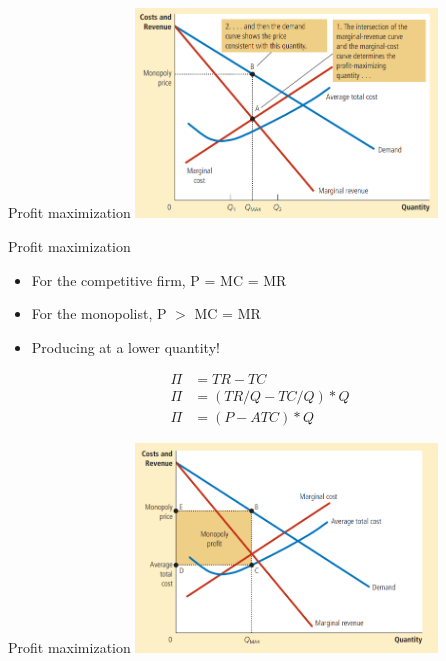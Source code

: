 \documentclass[aspectratio=169]{beamer}
\begin{document}
\begin{frame}{Profit maximization}
    \centering
    \includegraphics[width = 0.6\textwidth,keepaspectratio]{../figs/profitmax.png}
\end{frame}

\begin{frame}{Profit maximization}
    \begin{itemize}
        \item For the competitive firm, P = MC = MR
        \item For the monopolist, P $>$ MC = MR
        \item Producing at a lower quantity!
    \end{itemize}

    \begin{equation*}
        \begin{split}
            \Pi & = TR - TC \\
            \Pi & = (TR/Q - TC/Q)*Q \\
            \Pi & = (P - ATC) * Q
        \end{split}
    \end{equation*}
\end{frame}

\begin{frame}{Profit maximization}
    \centering
    \includegraphics[width = 0.6\textwidth,keepaspectratio]{../figs/totalprofit.png}
\end{frame}
\end{document}
